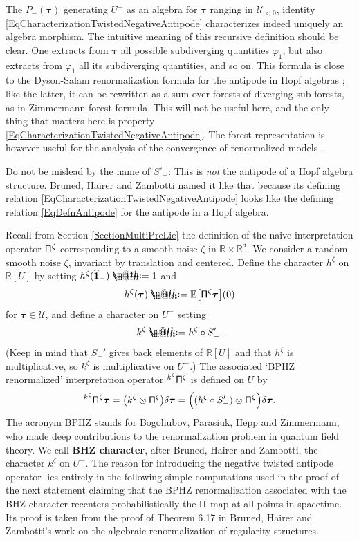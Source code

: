 \documentclass[10pt, reqno]{amsart}
\makeatletter
\numberwithin{subsection}{section}
\numberwithin{subsubsection}{subsection}
\numberwithin{equation}{section} %
\theoremstyle{mystyle}
\theoremstyle{mystyle2}
\theoremstyle{mystyle3}
\newcommand{\bstau}{\boldsymbol{\tau}}
\newcommand{\ssk}{\smallskip}
\newcommand\bbE{\mathbb{E}}
\newcommand\bbR{\mathbb{R}}
\newcommand\mcU{\mathcal U}
\newcommand*{\defeq}{\mathrel{\rlap{%
                     \raisebox{0.3ex}{$\m@th\cdot$}}%
                     \raisebox{-0.3ex}{$\m@th\cdot$}}%
                     =}
\makeatother
\begin{document}
\medskip

The $P_-(\bstau)$ generating $U^-$ as an algebra for $\bstau$ ranging in $\mcU_{<0}$, identity \eqref{EqCharacterizationTwistedNegativeAntipode} characterizes indeed uniquely an algebra morphism. The intuitive meaning of this recursive definition should be clear. One extracts from $\bstau$ all possible subdiverging quantities $\varphi_1$, but also extracts from $\varphi_1$ all its subdiverging quantities, and so on. This formula is close to 
the Dyson-Salam renormalization formula for the antipode in Hopf algebras 
\cite{FigueroaGB}; like the latter, it can be rewritten as a sum over forests of diverging sub-forests, as in Zimmermann forest formula. This will 
not be useful here, and the only thing that matters here is property \eqref{EqCharacterizationTwistedNegativeAntipode}. The forest representation is however useful for the analysis of the convergence of renormalized models \cite{ChandraHairer}.

\ssk

Do not be mislead by the name  of $S'_-$: This is {\it not} the antipode of a Hopf algebra structure. Bruned, Hairer and Zambotti named it like that because its defining relation \eqref{EqCharacterizationTwistedNegativeAntipode} looks like the defining relation \eqref{EqDefnAntipode} for the 
antipode in a Hopf algebra.

\ssk

Recall from Section \ref{SectionMultiPreLie} the definition of the naive interpretation operator ${\sf \Pi}^\zeta$ corresponding to a smooth noise $\zeta$ in $\bbR\times\bbR^d$. We consider a random smooth noise $\zeta$, invariant by translation and centered. 
Define the character $h^\zeta$ on $\mathbb{R}[U]$ by setting
$h^\zeta(\widehat{\bf1}_{-})\defeq 1$ and
\begin{equation} \label{EqRenormCharacter}
h^\zeta(\bstau) \defeq  \bbE\big[{\sf \Pi}^\zeta\bstau\big](0)
\end{equation}
for $\bstau\in\mcU$, and define a character on $U^-$ setting 
$$
k^\zeta \defeq  h^\zeta\circ S_-'.
$$
(Keep in mind that $S_-'$ gives back elements of $\bbR[U]$ and that $h^\zeta$ is multiplicative, so $k^\zeta$ is multiplicative on $U^-$.) The associated `{\sf BPHZ} renormalized' interpretation operator $^{k^\zeta}{\sf \Pi}^\zeta$ is defined on $U$ by 
$$
 ^{k^\zeta}{\sf \Pi}^\zeta\bstau = \big(k^\zeta\otimes {\sf \Pi}^\zeta\big)\delta\bstau = \Big((h^\zeta\circ S'_-)\otimes {\sf \Pi}^\zeta\Big)\delta\bstau.
$$
The acronym BPHZ stands for Bogoliubov, Parasiuk, Hepp and Zimmermann, who made deep contributions to the renormalization problem in quantum field theory. We call \textbf{\textsf{BHZ character}}, after Bruned, Hairer and Zambotti, the character $k^\zeta$ on $U^-$. The reason for introducing the negative twisted antipode operator lies entirely in the following simple computations used in the proof of the next statement claiming that the BPHZ renormalization associated with the BHZ character recenters probabilistically the $\sf \Pi$ map at all points in spacetime. Its proof is taken from the proof of Theorem 6.17 in Bruned, Hairer and Zambotti's work \cite{BHZ} on the 
algebraic renormalization of regularity structures. 
\end{document}
